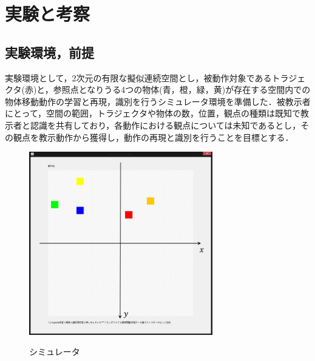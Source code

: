 ﻿%
\chapter{実験と考察}

\section{実験環境，前提}

実験環境として，2次元の有限な擬似連続空間とし，被動作対象であるトラジェクタ(赤)と，参照点となりうる4つの物体(青，橙，緑，黄)が存在する空間内での物体移動動作の学習と再現，識別を行うシミュレータ環境を準備した．被教示者にとって，空間の範囲，トラジェクタや物体の数，位置，観点の種類は既知で教示者と認識を共有しており，各動作における観点については未知であるとし，その観点を教示動作から獲得し，動作の再現と識別を行うことを目標とする．
	\begin{figure}[b]
		\begin{center}
			\includegraphics[width=8cm]{figure3.png} \\ %
			\caption{シミュレータ}
		\end{center}
	\end{figure}

